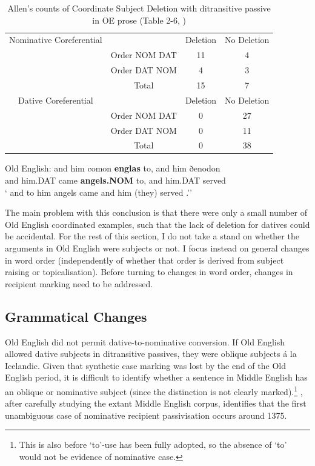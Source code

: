	\begin{table}[t]
		\begin{tabular}{cccc}
			Nominative Coreferential & & Deletion & No Deletion \\
			& Order NOM DAT & 11 & 4 \\
			& Order DAT NOM & 4 & 3 \\
			& Total & 15 & 7 \\
			\hline
			Dative Coreferential & & Deletion & No Deletion \\
			& Order NOM DAT & 0 & 27 \\
			& Order DAT NOM & 0 & 11 \\
			& Total & 0 & 38 \\
		\end{tabular}
		\caption{Allen's counts of Coordinate Subject Deletion with ditransitive passive in OE prose (Table 2-6, \citealt{Allen.1999})}
		\label{tab:AllenOECSD}
	\end{table}

	\begin{exe}
		\ex \label{ex:OECSD} Old English:
		\gll and him comon \textbf{englas} to, and him ðenodon\\
		and him.DAT came \textbf{angels.NOM} to, and him.DAT served\\
		\trans ` and to him angels came and him (they) served \citep[ex. 34]{Allen.1999}.''
	\end{exe}

	The main problem with this conclusion is that there were only a small number of Old English coordinated examples, such that the lack of deletion for datives could be accidental. For the rest of this section, I do not take a stand on whether the arguments in Old English were subjects or not. I focus instead on general changes in word order (independently of whether that order is derived from subject raising or topicalisation). Before turning to changes in word order, changes in recipient marking need to be addressed.

	\subsection{Grammatical Changes}
	Old English did not permit dative-to-nominative conversion. If Old English allowed dative subjects in ditransitive passives, they were oblique subjects \'{a} la Icelandic. Given that synthetic case marking was lost by the end of the Old English period, it is difficult to identify whether a sentence in Middle English has an oblique or nominative subject (since the distinction is not clearly marked).\footnote{This is also before `to'-use has been fully adopted, so the absence of `to' would not be evidence of nominative case.} \cite{Allen.1999}, after carefully studying the extant Middle English corpus, identifies that the first unambiguous case of nominative recipient passivisation occurs around 1375. 

